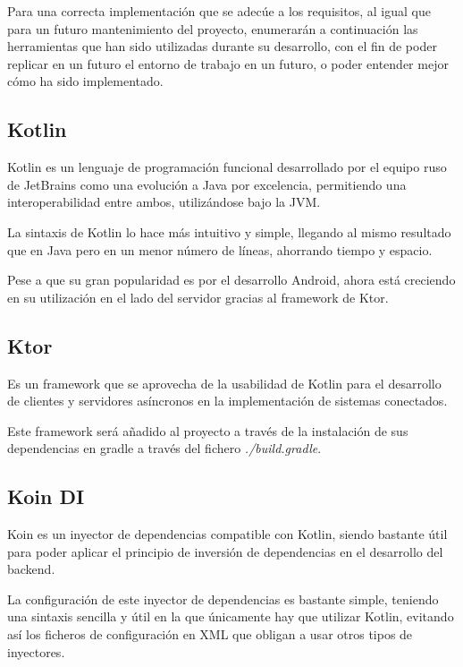 Para una correcta implementación que se adecúe a los requisitos, al igual que para un futuro mantenimiento del proyecto, enumerarán a continuación las herramientas que han sido utilizadas durante su desarrollo, con el fin de poder replicar en un futuro el entorno de trabajo en un futuro, o poder entender mejor cómo ha sido implementado.

    \subsection{Kotlin}

Kotlin es un lenguaje de programación funcional desarrollado por el equipo ruso de JetBrains como una evolución a Java por excelencia, permitiendo una interoperabilidad entre ambos, utilizándose bajo la JVM.

La sintaxis de Kotlin lo hace más intuitivo y simple, llegando al mismo resultado que en Java pero en un menor número de líneas, ahorrando tiempo y espacio.

Pese a que su gran popularidad es por el desarrollo Android, ahora está creciendo en su utilización en el lado del servidor gracias al framework de Ktor.~\cite{ktor}

    \subsection{Ktor}

Es un framework que se aprovecha de la usabilidad de Kotlin para el desarrollo de clientes y servidores asíncronos en la implementación de sistemas conectados.

Este framework será añadido al proyecto a través de la instalación de sus dependencias en gradle a través del fichero \textit{./build.gradle}.

    \subsection{Koin DI}
    \label{Koin}

Koin es un inyector de dependencias compatible con Kotlin, siendo bastante útil para poder aplicar el principio de inversión de dependencias en el desarrollo del backend.~\cite{koin}

La configuración de este inyector de dependencias es bastante simple, teniendo una sintaxis sencilla y útil en la que únicamente hay que utilizar Kotlin, evitando así los ficheros de configuración en XML que obligan a usar otros tipos de inyectores.

